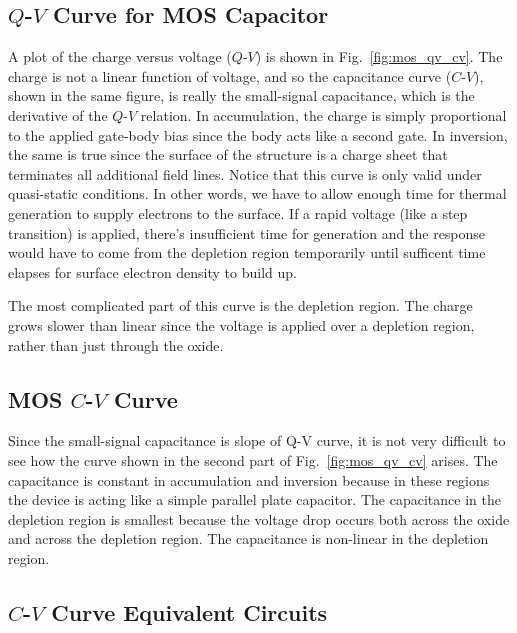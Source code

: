 \subsection{$Q$-$V$ Curve for MOS Capacitor}

A plot of the charge versus voltage ($Q$-$V$) is shown in Fig.~\ref{fig:mos_qv_cv}.  The charge is not a linear function of voltage, and so the capacitance curve ($C$-$V$), shown in the same figure, is really the small-signal capacitance, which is the derivative of the $Q$-$V$ relation.   In accumulation, the charge is simply proportional to the applied gate-body bias since the body acts like a second gate.  In inversion, the same is true since the surface of the structure is a charge sheet that terminates all additional field lines.  Notice that this curve is only valid under quasi-static conditions.  In other words, we have to allow enough time for thermal generation to supply electrons to the surface.  If a rapid voltage (like a step transition) is applied, there's insufficient time for generation and the response would have to come from the depletion region temporarily until sufficent time elapses for surface electron density to build up.  

The most complicated part of this curve is the depletion region.  The charge grows slower than linear since the voltage is applied over a depletion region, rather than just through the oxide.  
 


\subsection{MOS $C$-$V$ Curve}

Since the small-signal capacitance is slope of Q-V curve, it is not very difficult to see how the curve shown in the second part of Fig.~\ref{fig:mos_qv_cv} arises.  The capacitance is constant in accumulation and inversion because in these regions the device is acting like a simple parallel plate capacitor.  The capacitance in the depletion region is smallest because the voltage drop occurs both across the oxide and across the depletion region.  The capacitance is non-linear in the depletion region.  
 

\subsection{$C$-$V$ Curve Equivalent Circuits}

